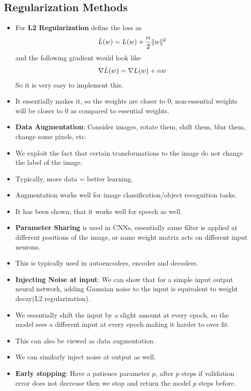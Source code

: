 \documentclass[a4paper]{article}
\begin{document}
\subsection{Regularization Methods}
\begin{itemize}
    \item For \textbf{L2 Regularization} define the loss as
    \begin{equation*}
        \Bar{L}(w)=L(w)+\frac{\alpha}{2}\lVert w\rVert^2
    \end{equation*}
    and the following gradient would look like
    \begin{equation*}
        \nabla \Bar{L}(w)=\nabla L(w)+\alpha w
    \end{equation*}
    So it is very easy to implement this.
    \item It essentially makes it, so the weights are closer to $0$, non-essential weights will be closer to $0$ as compared to essential weights.
    \item \textbf{Data Augmentation}: Consider images, rotate them, shift them, blur them, change some pixels, etc.
    \item We exploit the fact that certain transformations to the image do not change the label of the image.
    \item Typically, more data = better learning.
    \item Augmentation works well for image classification/object recognition tasks.
    \item It has been shown, that it works well for speech as well.
    \item \textbf{Parameter Sharing} is used in CNNs, essentially same filter is applied at different positions of the image, or same weight matrix acts on different input neurons.
    \item This is typically used in autoencoders, encoder and decoders.
    \item \textbf{Injecting Noise at input}: We can show that for a simple input output neural network, adding Gaussian noise to the input is equivalent to weight decay(L2 regularization).
    \item We essentially shift the input by a slight amount at every epoch, so the model sees a different input at every epoch making it harder to over fit.
    \item This can also be viewed as data augmentation.
    \item We can similarly inject noise at output as well.
    \item \textbf{Early stopping}: Have a patience parameter $p$, after $p$ steps if validation error does not decrease then we stop and return the model $p$ steps before.

\end{itemize}
\end{document}
